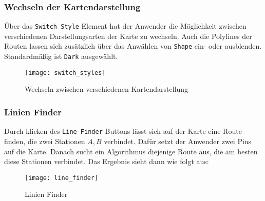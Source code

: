       \pagebreak
      

    \subsubsection*{Wechseln der Kartendarstellung}
    \label{ssub:style_auswahl}
      Über das \texttt{Switch Style}  Element hat der Anwender die Möglichkeit zwischen verschiedenen Darstellungsarten der Karte zu wechseln. Auch die Polylines der Routen lassen sich zusätzlich über das Anwählen von \texttt{Shape} ein- oder ausblenden. Standardmäßig ist \texttt{Dark} ausgewählt.

      \begin{figure}[htbp]
        \begin{center}
          \texttt{[image: switch\_styles]}
          \caption{Wechseln zwischen verschiedenen Kartendarstellung}
          \label{fig:switch_styles}
        \end{center}
      \end{figure}
      

    \subsubsection*{Linien Finder}
    \label{ssub:linien_finder}
      Durch klicken des \texttt{Line Finder}  Buttons lässt sich auf der Karte eine Route finden, die zwei Stationen $A, B$ verbindet. Dafür setzt der Anwender zwei Pins auf die Karte. Danach sucht ein Algorithmus diejenige Route aus, die am besten diese Stationen verbindet. Das Ergebnis sieht dann wie folgt aus:

      \begin{figure}[htbp]
        \begin{center}
          \texttt{[image: line\_finder]}
          \caption{Linien Finder}
          \label{fig:line_finder}
        \end{center}
      \end{figure}

